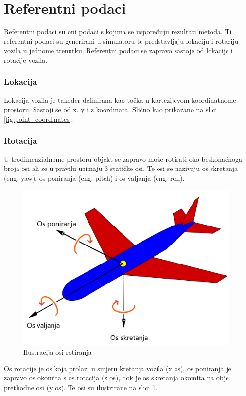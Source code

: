 \section{Referentni podaci}

Referentni podaci su oni podaci s kojima se uspoređuju rezultati metoda. Ti referentni podaci su generirani u simulatoru te predstavljaju lokaciju i rotaciju vozila u jednome trenutku. Referentni podaci se zapravo sastoje od lokacije i rotacije vozila.

\subsubsection{Lokacija}
Lokacija vozila je također definirana kao točka u kartezijevom koordinatnome prostoru. Sastoji se od x, y i z koordinata. Slično kao prikazano na slici \ref{fig:point_coordinates}.


\subsubsection{Rotacija}
 U trodimenzialnome prostoru objekt se zapravo može rotirati oko beskonaćnoga broja osi ali se u pravilu uzimaju 3 statičke osi. Te osi se nazivaju os skretanja (eng. yaw), os poniranja (eng. pitch) i os valjanja (eng. roll). 

\begin{figure}[ht!]
  \centering
  \includegraphics[scale=0.3]{images/yaw_roll_pitch_example.png}
  \caption{Ilustracija osi rotiranja}
  \label{fig:yaw_roll_pitch_example}
\end{figure}


Os rotacije je os koja prolazi u smjeru kretanja vozila (x os), os poniranja je zapravo os okomita s os rotacija (z os), dok je os skretanja okomita na obje prethodne osi (y os). Te osi su ilustrirane na slici \ref{fig:yaw_roll_pitch_example}.




